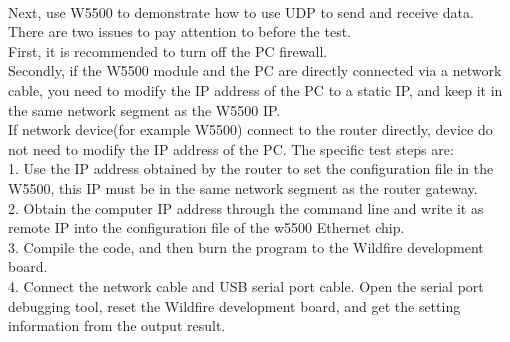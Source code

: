 \\
Next, use W5500 to demonstrate how to use UDP to send and receive data. There are two issues to pay attention to before the test. 
\\
First, it is recommended to turn off the PC firewall.
\\
Secondly, if the W5500 module and the PC are directly connected via a network cable, you need to modify the IP address of the PC to a static IP, and keep it in the same network segment as the W5500 IP. 
\\
If network device(for example W5500) connect to the router directly, device do not need to modify the IP address of the PC. The specific test steps are:
\\
1. Use the IP address obtained by the router to set the configuration file in the W5500, this IP must be in the same network segment as the router gateway.
\\
2. Obtain the computer IP address through the command line and write it as remote IP into the configuration file of the w5500 Ethernet chip.
\\
3. Compile the code, and then burn the program to the Wildfire development board.
\\
4. Connect the network cable and USB serial port cable. Open the serial port debugging tool, reset the Wildfire development board, and get the setting information from the output result.

